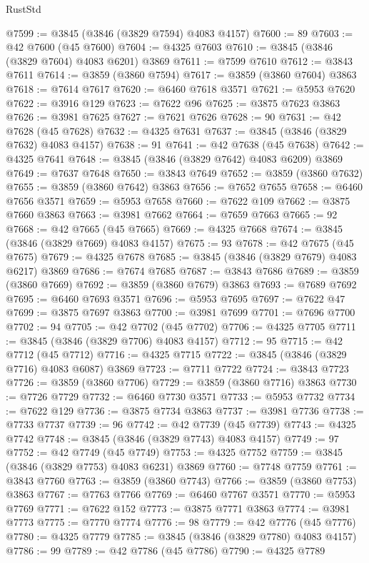 \begin{lexlean}{RustStd}
\begin{coremodule}
@7599 := @3845 (@3846 (@3829 @7594) @4083 @4157)
@7600 := 89
@7603 := @42 @7600 (@45 @7600)
@7604 := @4325 @7603
@7610 := @3845 (@3846 (@3829 @7604) @4083 @6201) @3869
@7611 := @7599 @7610
@7612 := @3843 @7611
@7614 := @3859 (@3860 @7594)
@7617 := @3859 (@3860 @7604) @3863
@7618 := @7614 @7617
@7620 := @6460 @7618 @3571
@7621 := @5953 @7620
@7622 := @3916 @129
@7623 := @7622 @96
@7625 := @3875 @7623 @3863
@7626 := @3981 @7625
@7627 := @7621 @7626
@7628 := 90
@7631 := @42 @7628 (@45 @7628)
@7632 := @4325 @7631
@7637 := @3845 (@3846 (@3829 @7632) @4083 @4157)
@7638 := 91
@7641 := @42 @7638 (@45 @7638)
@7642 := @4325 @7641
@7648 := @3845 (@3846 (@3829 @7642) @4083 @6209) @3869
@7649 := @7637 @7648
@7650 := @3843 @7649
@7652 := @3859 (@3860 @7632)
@7655 := @3859 (@3860 @7642) @3863
@7656 := @7652 @7655
@7658 := @6460 @7656 @3571
@7659 := @5953 @7658
@7660 := @7622 @109
@7662 := @3875 @7660 @3863
@7663 := @3981 @7662
@7664 := @7659 @7663
@7665 := 92
@7668 := @42 @7665 (@45 @7665)
@7669 := @4325 @7668
@7674 := @3845 (@3846 (@3829 @7669) @4083 @4157)
@7675 := 93
@7678 := @42 @7675 (@45 @7675)
@7679 := @4325 @7678
@7685 := @3845 (@3846 (@3829 @7679) @4083 @6217) @3869
@7686 := @7674 @7685
@7687 := @3843 @7686
@7689 := @3859 (@3860 @7669)
@7692 := @3859 (@3860 @7679) @3863
@7693 := @7689 @7692
@7695 := @6460 @7693 @3571
@7696 := @5953 @7695
@7697 := @7622 @47
@7699 := @3875 @7697 @3863
@7700 := @3981 @7699
@7701 := @7696 @7700
@7702 := 94
@7705 := @42 @7702 (@45 @7702)
@7706 := @4325 @7705
@7711 := @3845 (@3846 (@3829 @7706) @4083 @4157)
@7712 := 95
@7715 := @42 @7712 (@45 @7712)
@7716 := @4325 @7715
@7722 := @3845 (@3846 (@3829 @7716) @4083 @6087) @3869
@7723 := @7711 @7722
@7724 := @3843 @7723
@7726 := @3859 (@3860 @7706)
@7729 := @3859 (@3860 @7716) @3863
@7730 := @7726 @7729
@7732 := @6460 @7730 @3571
@7733 := @5953 @7732
@7734 := @7622 @129
@7736 := @3875 @7734 @3863
@7737 := @3981 @7736
@7738 := @7733 @7737
@7739 := 96
@7742 := @42 @7739 (@45 @7739)
@7743 := @4325 @7742
@7748 := @3845 (@3846 (@3829 @7743) @4083 @4157)
@7749 := 97
@7752 := @42 @7749 (@45 @7749)
@7753 := @4325 @7752
@7759 := @3845 (@3846 (@3829 @7753) @4083 @6231) @3869
@7760 := @7748 @7759
@7761 := @3843 @7760
@7763 := @3859 (@3860 @7743)
@7766 := @3859 (@3860 @7753) @3863
@7767 := @7763 @7766
@7769 := @6460 @7767 @3571
@7770 := @5953 @7769
@7771 := @7622 @152
@7773 := @3875 @7771 @3863
@7774 := @3981 @7773
@7775 := @7770 @7774
@7776 := 98
@7779 := @42 @7776 (@45 @7776)
@7780 := @4325 @7779
@7785 := @3845 (@3846 (@3829 @7780) @4083 @4157)
@7786 := 99
@7789 := @42 @7786 (@45 @7786)
@7790 := @4325 @7789

\end{coremodule}
\end{lexlean}
